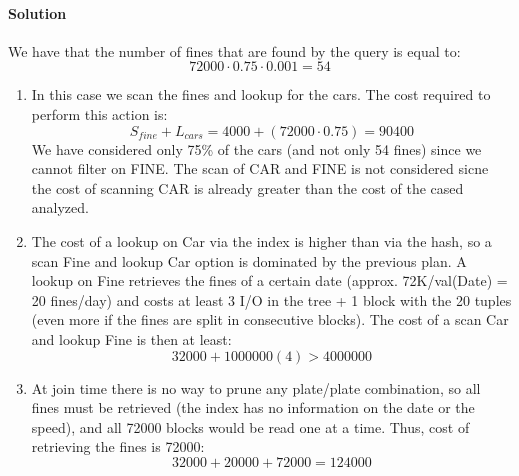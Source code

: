\paragraph*{Solution}
We have that the number of fines that are found by the query is equal to: 
\[72000 \cdot 0.75 \cdot 0.001=54\]
\begin{enumerate}
    \item In this case we scan the fines and lookup for the cars. 
        The cost required to perform this action is: 
        \[S_{fine}+L_{cars}=4000+\left(72000 \cdot 0.75\right) =90400\]
        We have considered only 75\% of the cars (and not only 54 fines) since we cannot filter on FINE. 
        The scan of CAR and FINE is not considered sicne the cost of scanning CAR is already greater than the cost of the cased analyzed. 
    \item The cost of a lookup on Car via the index is higher than via the hash, so a scan Fine and lookup Car option is dominated by the previous plan.
        A lookup on Fine retrieves the fines of a certain date (approx. 72K/val(Date) = 20 fines/day) and costs at least 3 I/O in the tree + 1 block with the 20 tuples (even more if the fines are split in consecutive blocks).
        The cost of a scan Car and lookup Fine is then at least:
        \[32000 + 1000000( 4 )> 4000000\]
    \item At join time there is no way to prune any plate/plate combination, so all fines must be retrieved (the index has no information on the date or the speed), and all 72000 blocks would be read one at a time. 
        Thus, cost of retrieving the fines is 72000:
        \[32000 + 20000 + 72000 = 124000\]
\end{enumerate}